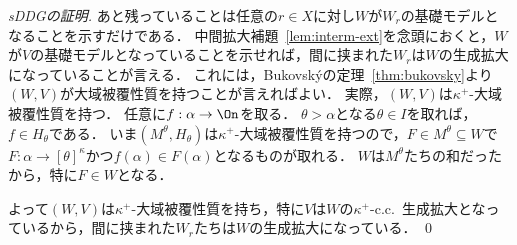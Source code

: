 \documentclass[a4j,leqno]{ltjsarticle}
\newcommand{\cc}{c.c.\ }
\begin{document}
\begin{proof}[sDDGの証明]
 あと残っていることは任意の$r \in X$に対し$W$が$W_r$の基礎モデルとなることを示すだけである．
 中間拡大補題~\ref{lem:interm-ext}を念頭におくと，$W$が$V$の基礎モデルとなっていることを示せれば，間に挟まれた$W_r$は$W$の生成拡大になっていることが言える．
 これには，Bukovsk\'{y}の定理~\ref{thm:bukovsky}より$(W, V)$が大域被覆性質を持つことが言えればよい．
 実際，$(W, V)$は$\kappa^+$-大域被覆性質を持つ．
 任意に$f: \alpha \to \On$を取る．
 $\theta > \alpha$となる$\theta \in I$を取れば，$f \in H_\theta$である．
 いま$(M^\theta, H_\theta)$は$\kappa^+$-大域被覆性質を持つので，$F \in M^\theta \subseteq W$で$F: \alpha \to [\theta]^{\kappa}$かつ$f(\alpha) \in F(\alpha)$となるものが取れる．
 $W$は$M^\theta$たちの和だったから，特に$F \in W$となる．

 よって$(W, V)$は$\kappa^+$-大域被覆性質を持ち，特に$V$は$W$の$\kappa^+$-\cc{}生成拡大となっているから，間に挟まれた$W_r$たちは$W$の生成拡大になっている． \qed
\end{proof}
\nocite{Fuchs:2014fj,Usuba:2017fp}
\nocite{Friedman:2016lr}
\printbibliography[title=参考文献]
\end{document}
